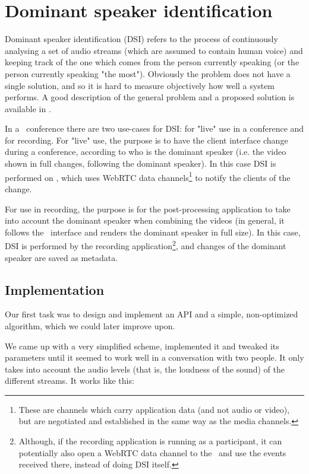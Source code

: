 \documentclass[twoside,openright,a4paper,12pt,english]{article}
\begin{document}
\section{Dominant speaker identification}
\label{dsd}
Dominant speaker identification (DSI) refers to the process of continuously analysing a set of audio streams
(which are assumed to contain human voice) and keeping track of the one which
comes from the person currently speaking (or the person currently speaking "the
most"). Obviously the problem does not have a single solution, and so it is hard
to measure objectively how well a system performs. A good description of the
general problem and a proposed solution is available in \cite{volfin2012}. 

In a \jm\ conference there are two use-cases for DSI: for "live" use in a
conference and for recording. 
For "live" use, the purpose is to have the client interface change during a
conference, according to who is the dominant speaker (i.e. the video shown in
full changes, following the dominant speaker). In this case DSI is performed
on \jvb, which uses WebRTC data channels\footnote{These are channels which
carry application data (and not audio or video), but are negotiated and
established in the same way as the media channels.}
to notify the clients of the change.

For use in recording, the purpose is for the post-processing application to
take into account the dominant speaker when combining the videos (in general,
it follows the \jm\ interface and renders the dominant speaker in full size).
In this case, DSI is performed by the recording application\footnote{Although,
if the recording application is running as a participant, it can potentially
also open a WebRTC data channel to the \jvb\ and use the events received there,
instead of doing DSI itself.}, and changes of
the dominant speaker are saved as metadata.

\subsection{Implementation}
Our first task was to design and implement an API and a simple, non-optimized
algorithm, which we could later improve upon. 

We came up with a very simplified scheme, implemented it and tweaked its parameters until it seemed to
work well in a conversation with two people. It only takes into account the
audio levels (that is, the loudness of the sound) of the different streams. It
works like this:
\end{document}
